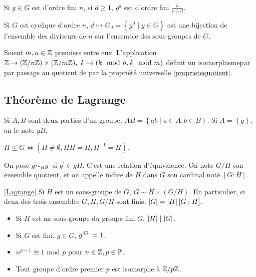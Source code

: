 \documentclass{cours}
\begin{document}
\begin{remark}
    Si $g \in G$ est d'ordre fini $n$, si $d \geq 1$, $g^{d}$ est d'ordre fini $\frac{n}{n \wedge d}$.
\end{remark}

\begin{proposition}
    Si $G$ est cyclique d'ordre $n$, $d \mapsto G_{d} = \left\{g^{d} \mid g \in G\right\}$ est une bijection de l'ensemble des diviseurs de $n$ sur l'ensemble des sous-groupes de $G$. 
\end{proposition}

\begin{theorem}[Chinois]
    Soient $m, n \in \mathbb{Z}$ premiers entre eux. L'application $\mathbb{Z} \rightarrow (\mathbb{Z}/n\mathbb{Z}) \times (\mathbb{Z}/m\mathbb{Z}),\ k \mapsto \left(k \mod n, k \mod m\right)$ définit un isomorphismepar par passage au quotient de par la propriété universelle \ref{proprietequotient}.
\end{theorem}

\subsection{Théorème de Lagrange} %
\begin{definition}
    Si $A, B$ sont deux parties d'un groupe, $AB = \left\{ab \mid a \in A, b\in B\right\}$. Si $A = \left\{g\right\}$, on le note $gB$.
\end{definition}
\begin{lemma}
    $H \leq G \Leftrightarrow \left(H \neq \emptyset, HH = H, H^{-1} = H\right)$.
\end{lemma}
\begin{definition}
    On pose $g\sim_{H}g^{'}$ si $g^{'} \in gH$. C'est une relation d'équivalence. On note $G/H$ son ensemble quotient, et on appelle indice de $H$ dans $G$ son cardinal noté $[G : H]$.
\end{definition}

\begin{theorem}[Lagrange]\ref{Lagrange}
    Si $H$ est un sous-groupe de $G$, $G \sim H \times (G/H)$. En particulier, si deux des trois ensembles $G, H, G/H$ sont finis, $\left|G\right| = \left|H\right|\left[G : H\right]$.
\end{theorem}
\begin{corollary}
    \begin{itemize}
        \item Si $H$ est un sous-groupe du groupe fini $G$, $\left|H\right| \mid \left|G\right|$.
        \item Si $G$ est fini, $g\in G$, $g^{\left|G\right|} = 1$.
        \item $n^{p-1} \cong 1 \text{ mod } p$ pour $n\in \mathbb{Z}, p \in \mathbb{P}$.
        \item Tout groupe d'ordre premier $p$ est isomorphe à $\mathbb{Z}/p\mathbb{Z}$.
    \end{itemize}
\end{corollary}
\end{document}
